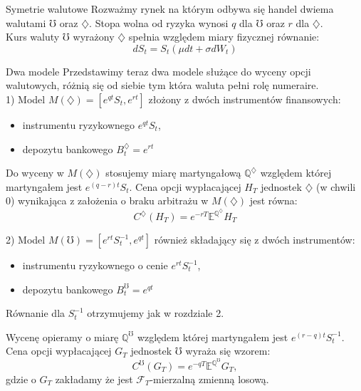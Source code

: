 \documentclass[11pt]{report}
\begin{document}
\begin{chapter}{Symetrie walutowe}
Rozważmy rynek na którym odbywa się handel dwiema walutami $\mho$ oraz $\diamondsuit$.
Stopa wolna od ryzyka wynosi $q$ dla $\mho$ oraz $r$ dla $\diamondsuit$. \\
Kurs waluty $\mho$ wyrażony $\diamondsuit$ spełnia względem miary fizycznej równanie:
\begin{equation*}
dS_t = S_t(\mu dt + \sigma dW_t)
\end{equation*}


\begin{section}{Dwa modele}
Przedstawimy teraz dwa modele służące do wyceny opcji walutowych, różnią się od siebie tym która waluta pełni rolę numeraire. \\

1) Model $M(\diamondsuit) = [e^{qt} S_t, e^{rt}]$ złożony z dwóch instrumentów finansowych:
\begin{itemize}
\item instrumentu ryzykownego $e^{qt}S_t$,
\item depozytu bankowego $B_t^{\diamondsuit} = e^{rt}$
\end{itemize}



Do wyceny w $M(\diamondsuit)$ stosujemy miarę martyngałową $\mathbb{Q}^{\diamondsuit}$ względem której martyngałem jest $e^{(q-r)t}S_t$.
Cena opcji wypłacającej $H_T$ jednostek $\diamondsuit$ (w chwili 0) wynikająca z założenia o braku arbitrażu w $M(\diamondsuit)$ jest równa:
\begin{equation*}
C^{\diamondsuit}(H_T) = e^{-rT}\mathbb{E}^{\mathbb{Q}^{\diamondsuit}}H_T
\end{equation*} 

2) Model $M(\mho) = [e^{rt}S_t^{-1}, e^{qt}]$ również składający się z dwóch instrumentów:
\begin{itemize}
\item instrumentu ryzykownego o cenie $e^{rt}S_t^{-1}$,
\item depozytu bankowego $B_t^{\mho} = e^{qt}$
\end{itemize}

Równanie dla $S_t^{-1}$ otrzymujemy jak w rozdziale 2.

Wycenę opieramy o miarę $\mathbb{Q}^{\mho}$ względem której martyngałem jest $e^{(r-q)t} S^{-1}_t$.
Cena opcji wypłacającej $G_T$ jednostek $\mho$ wyraża się wzorem:
\begin{equation*}
C^{\mho}(G_T) = e^{-qT}\mathbb{E}^{\mathbb{Q}^{\mho}}G_T,
\end{equation*}
gdzie o $G_T$ zakładamy że jest $\mathscr{F}_T$-mierzalną zmienną losową. 



\end{section}
\end{chapter}
\end{document}
